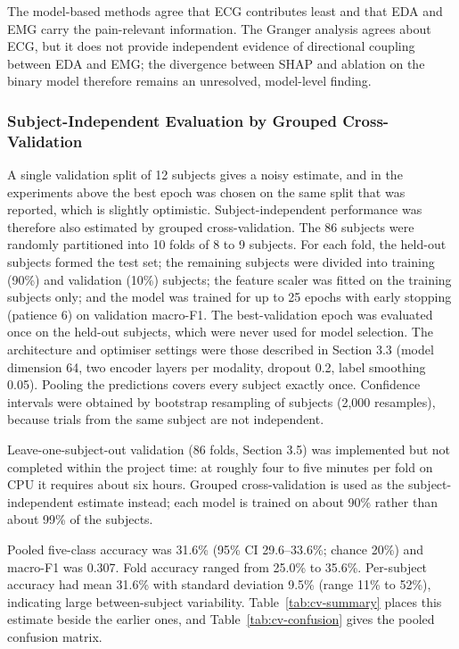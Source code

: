 The model-based methods agree that ECG contributes least and that EDA and EMG carry the pain-relevant information. The Granger analysis agrees about ECG, but it does not provide independent evidence of directional coupling between EDA and EMG; the divergence between SHAP and ablation on the binary model therefore remains an unresolved, model-level finding.



\subsubsection{Subject-Independent Evaluation by Grouped Cross-Validation}

A single validation split of 12 subjects gives a noisy estimate, and in the experiments above the best epoch was chosen on the same split that was reported, which is slightly optimistic. Subject-independent performance was therefore also estimated by grouped cross-validation. The 86 subjects were randomly partitioned into 10 folds of 8 to 9 subjects. For each fold, the held-out subjects formed the test set; the remaining subjects were divided into training (90\%) and validation (10\%) subjects; the feature scaler was fitted on the training subjects only; and the model was trained for up to 25 epochs with early stopping (patience 6) on validation macro-F1. The best-validation epoch was evaluated once on the held-out subjects, which were never used for model selection. The architecture and optimiser settings were those described in Section 3.3 (model dimension 64, two encoder layers per modality, dropout 0.2, label smoothing 0.05). Pooling the predictions covers every subject exactly once. Confidence intervals were obtained by bootstrap resampling of subjects (2{,}000 resamples), because trials from the same subject are not independent.

Leave-one-subject-out validation (86 folds, Section 3.5) was implemented but not completed within the project time: at roughly four to five minutes per fold on CPU it requires about six hours. Grouped cross-validation is used as the subject-independent estimate instead; each model is trained on about 90\% rather than about 99\% of the subjects.

Pooled five-class accuracy was 31.6\% (95\% CI 29.6--33.6\%; chance 20\%) and macro-F1 was 0.307. Fold accuracy ranged from 25.0\% to 35.6\%. Per-subject accuracy had mean 31.6\% with standard deviation 9.5\% (range 11\% to 52\%), indicating large between-subject variability. Table~\ref{tab:cv-summary} places this estimate beside the earlier ones, and Table~\ref{tab:cv-confusion} gives the pooled confusion matrix.

